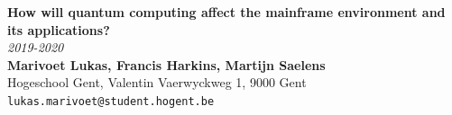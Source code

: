 \documentclass[a0,portrait]{a0poster}
\begin{document}


\begin{minipage}[t]{0.75\linewidth}
\VeryHuge \color{HoGentAccent1} \textbf{How will quantum computing affect the mainframe environment and its applications?} \color{Black}\\ %
\Huge\textit{2019-2020}\\[2.4cm] %
\huge \textbf{Marivoet Lukas, Francis Harkins, Martijn Saelens}\\[0.5cm] %
\huge Hogeschool Gent, Valentin Vaerwyckweg 1, 9000 Gent\\[0.4cm] %
\Large \texttt{lukas.marivoet@student.hogent.be} \\
\end{minipage}
%
\begin{minipage}[t]{0.25\linewidth}

\end{minipage}

\vspace{1cm} %

\end{document}
